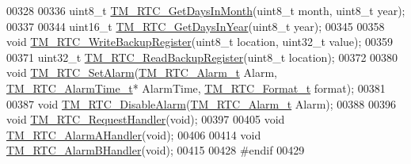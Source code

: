 \begin{DoxyCode}
00328 
00336 uint8\_t \hyperlink{group___t_m___r_t_c___functions_ga502000f5779e894fb0f0586b0e875a39}{TM\_RTC\_GetDaysInMonth}(uint8\_t month, uint8\_t year);
00337 
00344 uint16\_t \hyperlink{group___t_m___r_t_c___functions_ga27b98b821e1592bfca5eee2d8dd7d7cb}{TM\_RTC\_GetDaysInYear}(uint8\_t year);
00345 
00358 \textcolor{keywordtype}{void} \hyperlink{group___t_m___r_t_c___functions_ga0e64097447132cfaca8e9f966eb5b364}{TM\_RTC\_WriteBackupRegister}(uint8\_t location, uint32\_t value);
00359 
00371  uint32\_t \hyperlink{group___t_m___r_t_c___functions_ga36b9c6ac83cb17f06710ce83d1d2f407}{TM\_RTC\_ReadBackupRegister}(uint8\_t location);
00372 
00380 \textcolor{keywordtype}{void} \hyperlink{group___t_m___r_t_c___functions_gaee6b82bb5861cb4427cc4296dfa1c0ee}{TM\_RTC\_SetAlarm}(\hyperlink{group___t_m___r_t_c___typedefs_ga3c4d1d5831bf262f1994e8cc45007e7b}{TM\_RTC\_Alarm\_t} Alarm, 
      \hyperlink{struct_t_m___r_t_c___alarm_time__t}{TM\_RTC\_AlarmTime\_t}* AlarmTime, \hyperlink{group___t_m___r_t_c___typedefs_ga4ef7bf7d2c67f2dc6208ecb5926b0354}{TM\_RTC\_Format\_t} format);
00381 
00387 \textcolor{keywordtype}{void} \hyperlink{group___t_m___r_t_c___functions_ga46f745b32e15b1d3df2619114d1da9af}{TM\_RTC\_DisableAlarm}(\hyperlink{group___t_m___r_t_c___typedefs_ga3c4d1d5831bf262f1994e8cc45007e7b}{TM\_RTC\_Alarm\_t} Alarm);
00388 
00396 \textcolor{keywordtype}{void} \hyperlink{group___t_m___r_t_c___functions_gac7dd8cc4cabfeaea791b6004ebecc33b}{TM\_RTC\_RequestHandler}(\textcolor{keywordtype}{void});
00397 
00405 \textcolor{keywordtype}{void} \hyperlink{group___t_m___r_t_c___functions_ga67d39fc806bd2cf02b6bc2f93e818e45}{TM\_RTC\_AlarmAHandler}(\textcolor{keywordtype}{void});
00406 
00414 \textcolor{keywordtype}{void} \hyperlink{group___t_m___r_t_c___functions_gac02ceb4f42dcab6c1fec7af7a8350454}{TM\_RTC\_AlarmBHandler}(\textcolor{keywordtype}{void});
00415 
00428 \textcolor{preprocessor}{#endif}
00429 
\end{DoxyCode}
